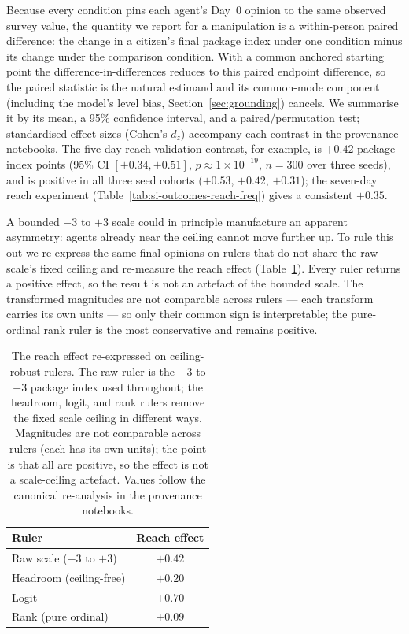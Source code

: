 \documentclass[pdflatex,sn-mathphys-num]{sn-jnl}%
\theoremstyle{thmstyleone}%
\theoremstyle{thmstyletwo}%
\theoremstyle{thmstylethree}%
\begin{document}
Because every condition pins each agent's Day~0 opinion to the same observed survey
value, the quantity we report for a manipulation is a within-person paired
difference: the change in a citizen's final package index under one condition minus
its change under the comparison condition. With a common anchored starting point the
difference-in-differences reduces to this paired endpoint difference, so the paired
statistic is the natural estimand and its common-mode component (including the
model's level bias, Section~\ref{sec:grounding}) cancels. We summarise it by its
mean, a 95\% confidence interval, and a paired/permutation test; standardised effect
sizes (Cohen's $d_z$) accompany each contrast in the provenance notebooks. The
five-day reach validation contrast, for example, is $+0.42$ package-index points (95\%
CI $[+0.34, +0.51]$, $p\approx1\times10^{-19}$, $n=300$ over three seeds), and is
positive in all three seed cohorts ($+0.53$, $+0.42$, $+0.31$); the seven-day reach
experiment (Table~\ref{tab:si-outcomes-reach-freq}) gives a consistent $+0.35$.

A bounded $-3$ to $+3$ scale could in principle manufacture an apparent asymmetry:
agents already near the ceiling cannot move further up. To rule this out we re-express
the same final opinions on rulers that do not share the raw scale's fixed ceiling and
re-measure the reach effect (Table~\ref{tab:si-rulers}). Every ruler returns a
positive effect, so the result is not an artefact of the bounded scale. The
transformed magnitudes are not comparable across rulers --- each transform carries
its own units --- so only their common sign is interpretable; the pure-ordinal rank
ruler is the most conservative and remains positive.

\begin{table}[t]
  \centering
  \footnotesize
  \caption{The reach effect re-expressed on ceiling-robust rulers. The raw ruler is
  the $-3$ to $+3$ package index used throughout; the headroom, logit, and rank
  rulers remove the fixed scale ceiling in different ways. Magnitudes are not
  comparable across rulers (each has its own units); the point is that all are
  positive, so the effect is not a scale-ceiling artefact. Values follow the
  canonical re-analysis in the provenance notebooks.}
  \label{tab:si-rulers}
  \begin{tabular}{@{}lc@{}}
    \toprule
    Ruler & Reach effect \\
    \midrule
    Raw scale ($-3$ to $+3$) & $+0.42$ \\
    Headroom (ceiling-free) & $+0.20$ \\
    Logit & $+0.70$ \\
    Rank (pure ordinal) & $+0.09$ \\
    \bottomrule
  \end{tabular}
\end{table}
\end{document}

